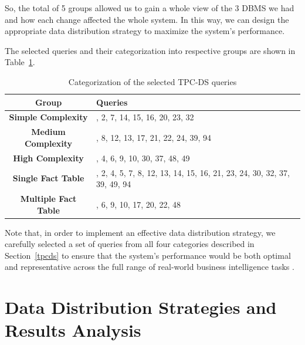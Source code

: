 \documentclass[conference]{IEEEtran}
\begin{document}
So, the total of 5 groups allowed us to gain a whole view of the 3 DBMS we had and how each change affected the whole system. In this way, we can design the appropriate data distribution strategy to maximize the system’s performance.

The selected queries and their categorization into respective groups are shown in Table~\ref{tab:query_groups}.

\begin{table}[h!]
    \centering
    \renewcommand{\arraystretch}{1.3}
    \caption{Categorization of the selected TPC-DS queries}
    \begin{tabular}{|>{\centering\arraybackslash}c|>{\centering\arraybackslash}m{6cm}|} %
        \hline
        \textbf{Group}               & \textbf{Queries}                                                         \\
        \hline
        \textbf{Simple Complexity}   & 1, 2, 7, 14, 15, 16, 20, 23, 32                                          \\
        \hline
        \textbf{Medium Complexity}   & 5, 8, 12, 13, 17, 21, 22, 24, 39, 94                                     \\
        \hline
        \textbf{High Complexity}     & 3, 4, 6, 9, 10, 30, 37, 48, 49                                           \\
        \hline
        \textbf{Single Fact Table}   & 1, 2, 4, 5, 7, 8, 12, 13, 14, 15, 16, 21, 23, 24, 30, 32, 37, 39, 49, 94 \\
        \hline
        \textbf{Multiple Fact Table} & 3, 6, 9, 10, 17, 20, 22, 48                                              \\
        \hline
    \end{tabular}
    \label{tab:query_groups}
\end{table}

Note that, in order to implement an effective data distribution strategy, we carefully selected a set of queries from all four categories described in Section~\ref{tpcds} to ensure that the system’s performance would be both optimal and representative across the full range of real-world business intelligence tasks \cite{b5}.

\section{Data Distribution Strategies and Results Analysis}
\end{document}
